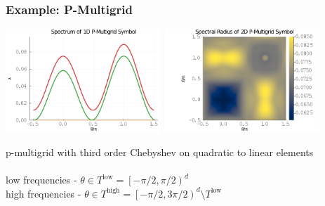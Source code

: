 \documentclass{beamer}
\begin{document}

\begin{frame}
\begin{center}
\frametitle{Example: P-Multigrid}

\includegraphics[height=3.9cm]{../img/pmultigridSymbol1D}
\includegraphics[height=3.9cm]{../img/pmultigridSymbol2D}

p-multigrid with third order Chebyshev on quadratic to linear elements\\

~\\

low frequencies - $\theta \in T^{\text{low}} = \left[ - \pi / 2, \pi / 2 \right)^d$\\

high frequencies - $\theta \in T^{\text{high}} = \left[ - \pi / 2, 3 \pi / 2 \right)^d \setminus T^{\text{low}}$

\end{center}
\end{frame}

\end{document}
